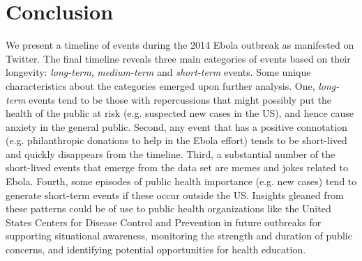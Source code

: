 \section{Conclusion}
\label{sec:conclusion}
We present a timeline of events during 
the 2014 Ebola outbreak as manifested on Twitter. 
The final timeline reveals
three main categories of events based on their
longevity:  \emph{long-term}, \emph{medium-term}
and \emph{short-term} events.  Some unique characteristics
about the categories emerged upon further analysis.
One, \emph{long-term} events tend to be those with repercussions
that might possibly put the health of the public at risk
(e.g. suspected new cases in the US), and hence cause
anxiety in the general public.  
Second, any event that has a positive connotation (e.g. philanthropic
donations to help in the Ebola effort) tends to be short-lived and
quickly disappears from the timeline.   
Third, a substantial number of the  short-lived events that emerge from the data set are
memes and jokes related to Ebola.  Fourth,  some episodes
of public health importance (e.g. new cases) tend to generate
short-term events if these occur outside the US.
Insights gleaned from these patterns could be of use to public 
health organizations like the United States Centers for 
Disease Control and Prevention in future outbreaks 
for supporting situational awareness, 
monitoring the strength and duration of public concerns, 
and identifying potential opportunities for health education.
